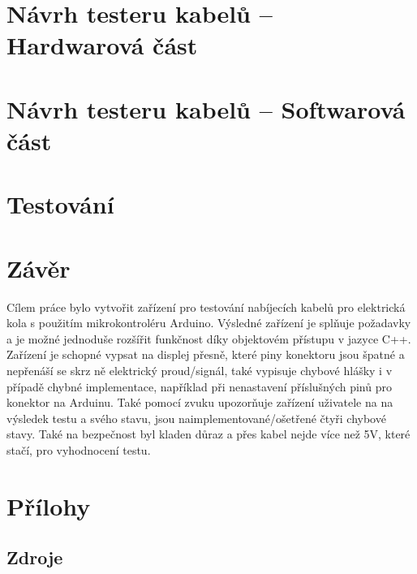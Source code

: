 \documentclass[12pt,a4paper,titlepage]{scrreprt}
\begin{document}
	\chapter{Návrh testeru kabelů – Hardwarová část}
	
	
	\chapter{Návrh testeru kabelů – Softwarová část}
	
	
	
	\chapter{Testování}
	
	
	
	\chapter{Závěr}
	Cílem práce bylo vytvořit zařízení pro testování nabíjecích kabelů pro elektrická kola s použitím mikrokontroléru Arduino. Výsledné zařízení je splňuje požadavky a je možné jednoduše rozšířit funkčnost díky objektovém přístupu v jazyce C++. Zařízení je schopné vypsat na displej přesně, které piny konektoru jsou špatné a nepřenáší se skrz ně elektrický proud/signál, také vypisuje chybové hlášky i v případě chybné implementace, například při nenastavení příslušných pinů pro konektor na Arduinu. Také pomocí zvuku upozorňuje zařízení uživatele na na výsledek testu a svého stavu, jsou naimplementované/ošetřené čtyři chybové stavy. Také na bezpečnost byl kladen důraz a přes kabel nejde více než 5V, které stačí, pro vyhodnocení testu.

	\newpage
	\chapter{Přílohy}
	\section*{Zdroje}
\end{document}
